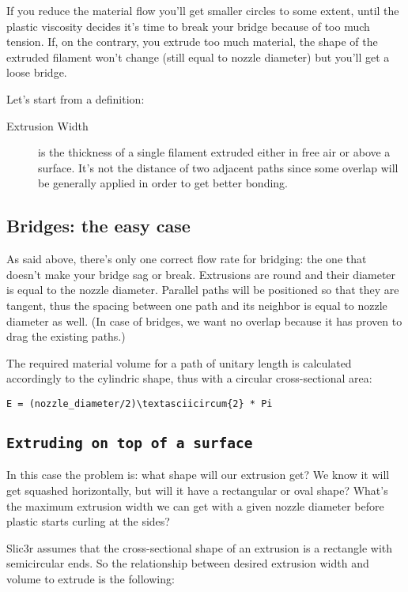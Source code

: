 If you reduce the material flow you'll get smaller circles to some extent, until the plastic viscosity decides it's time to break your bridge because of too much tension. If, on the contrary, you extrude too much material, the shape of the extruded filament won't change (still equal to nozzle diameter) but you'll get a loose bridge.

Let's start from a definition:

\begin{description}
\item[Extrusion Width] is the thickness of a single filament extruded either in free air or above a surface. It's not the distance of two adjacent paths since some overlap will be generally applied in order to get better bonding.
\end{description}

\subsection{Bridges: the easy case}
\label{sec:bridges}

As said above, there's only one correct flow rate for bridging: the one that doesn't make your bridge sag or break. Extrusions are round and their diameter is equal to the nozzle diameter. Parallel paths will be positioned so that they are tangent, thus the spacing between one path and its neighbor is equal to nozzle diameter as well. (In case of bridges, we want no overlap because it has proven to drag the existing paths.)

The required material volume for a path of unitary length is calculated accordingly to the cylindric shape, thus with a circular cross-sectional area:

\verb|E = (nozzle_diameter/2)\textasciicircum{2} * Pi|

\subsection{\texttt{Extruding on top of a surface}}
\label{sec:extruding_on_surface}

In this case the problem is: what shape will our extrusion get? We know it will get squashed horizontally, but will it have a rectangular or oval shape? What's the maximum extrusion width we can get with a given nozzle diameter before plastic starts curling at the sides?

Slic3r assumes that the cross-sectional shape of an extrusion is a rectangle with semicircular ends. So the relationship between desired extrusion width and volume to extrude is the following:

